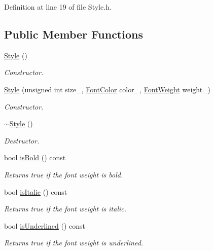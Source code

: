 Definition at line 19 of file Style.h.\subsection*{Public Member Functions}
\begin{CompactItemize}
\item 
\hyperlink{class_style_914f187818eb30c0cebe3df5378bfa0a}{Style} ()
\begin{CompactList}\small\item\em Constructor. \item\end{CompactList}\item 
\hyperlink{class_style_1d6e412d4343b4a6eb4253b6456928b6}{Style} (unsigned int size\_\-, \hyperlink{struct_font_color}{FontColor} color\_\-, \hyperlink{_font_weight_8h_ecff23ba4a68486421bcea57e095fe66}{FontWeight} weight\_\-)
\begin{CompactList}\small\item\em Constructor. \item\end{CompactList}\item 
\hyperlink{class_style_7c798ef9b77bc94719542feade497725}{$\sim$Style} ()
\begin{CompactList}\small\item\em Destructor. \item\end{CompactList}\item 
bool \hyperlink{class_style_59d23709575c5e6e5434ef0af5ff94b6}{isBold} () const 
\begin{CompactList}\small\item\em Returns true if the font weight is bold. \item\end{CompactList}\item 
bool \hyperlink{class_style_5d57a686b93123e8ca5f8f91afb596c1}{isItalic} () const 
\begin{CompactList}\small\item\em Returns true if the font weight is italic. \item\end{CompactList}\item 
bool \hyperlink{class_style_d1fcc32d8b565aae007012eb603fedcd}{isUnderlined} () const 
\begin{CompactList}\small\item\em Returns true if the font weight is underlined. \item\end{CompactList}\item 

\end{CompactItemize}

